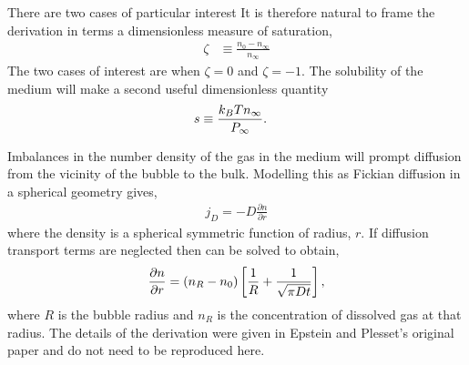There are two cases of particular interest
It is therefore natural to frame the derivation in terms a dimensionless measure of saturation,
\begin{align}
  \zeta &\equiv \frac{n_0 - n_\infty}{n_\infty }\label{eqn:nuc:saturation}
\end{align}
The two cases of interest are  when $\zeta = 0$ and $\zeta = -1$.
The solubility of the medium will make a second useful dimensionless quantity\cite{Gor2011}
\begin{align}
  s &\equiv \frac{k_B T n_\infty}{P_\infty} \label{eqn:nuc:solubility}.
\end{align}

Imbalances in the number density of the gas in the medium will prompt diffusion from the vicinity of the bubble to the bulk.
Modelling this as Fickian diffusion  in a spherical geometry gives,
\begin{align}
  j_D = -D \frac{\partial n}{\partial r}
  \label{eqn:nuc:Fickian}
\end{align}
where  the density is a spherical symmetric function of radius, $r$.
If diffusion transport terms are neglected then  can be solved to obtain,
\begin{align}
  \frac{\partial n}{\partial r} = \left( n_R - n_0 \right)\left[ \frac{1}{R} + \frac{1}{\sqrt{\pi D t}} \right],
\end{align}
where $R$ is the bubble radius and $n_R$ is the concentration of dissolved gas at that radius.
The details of the derivation were given in Epstein and Plesset's \cite{Epstein1950} original paper and do not need to be reproduced here.

